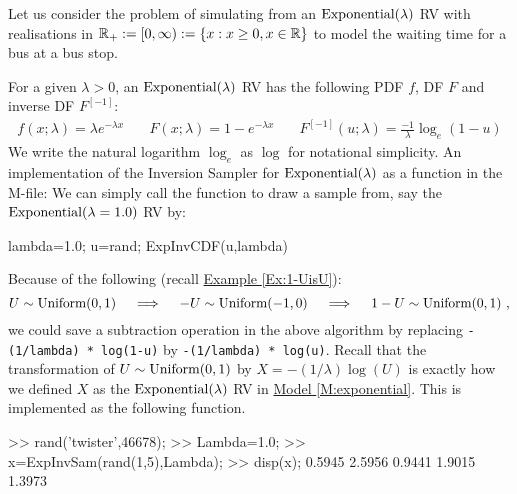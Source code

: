 Let us consider the problem of simulating from an $\exponential(\lambda)$ RV with realisations in $\mathbb{R}_+ := [0,\infty) := \{x: x \geq 0, x \in \mathbb{R}\}$ to model the waiting time for a bus at a bus stop.
\begin{simulation}[$\exponential(\lambda)$]\label{SIM:Exponential}
For a given $\lambda > 0$, an $\exponential(\lambda)$ RV has the following PDF $f$, DF $F$ and inverse DF $F^{[-1]}$:
\begin{eqnarray}
f(x; \lambda) = \lambda e^{-\lambda x} \quad &
F(x; \lambda)= 1-e^{-\lambda x} \quad &
F^{[-1]}(u; \lambda)= \frac{-1}{\lambda} \log_e (1-u)
\end{eqnarray}
We write the natural logarithm $\log_e$ as $\log$ for notational simplicity.  An implementation of the Inversion Sampler for $\exponential(\lambda)$ as a function in the M-file:
We can simply call the function to draw a sample from, say the $\mbox{{\rm Exponential}}(\lambda=1.0)$ RV by:
\begin{VrbM}
  lambda=1.0;			%
  u=rand;			%
  ExpInvCDF(u,lambda)	%
\end{VrbM}
Because of the following (recall \hyperref[Ex:1-UisU]{Example \ref*{Ex:1-UisU}}):
\[
 U \sim \mbox{{\rm Uniform}}(0,1) \quad \implies \quad
 -U \sim \mbox{{\rm Uniform}}(-1,0) \quad \implies \quad
 1-U \sim \mbox{{\rm Uniform}}(0,1)  \  ,
 \]
 we could save a subtraction operation in the above algorithm by replacing {\tt -(1/lambda) * log(1-u)} by {\tt -(1/lambda) * log(u)}. 
Recall that the transformation of $U \sim \mbox{{\rm Uniform}}(0,1)$ by $X=-(1/\lambda) \log(U)$ is exactly how we defined $X$ as the $\exponential(\lambda)$ RV in \hyperref[M:exponential]{Model \ref*{M:exponential}}. 
This is implemented as the following function.
\begin{VrbM}
>> rand('twister',46678); %
>> Lambda=1.0;  %
>> x=ExpInvSam(rand(1,5),Lambda); %
>> disp(x); %
    0.5945    2.5956    0.9441    1.9015    1.3973
\end{VrbM}
\end{simulation}

